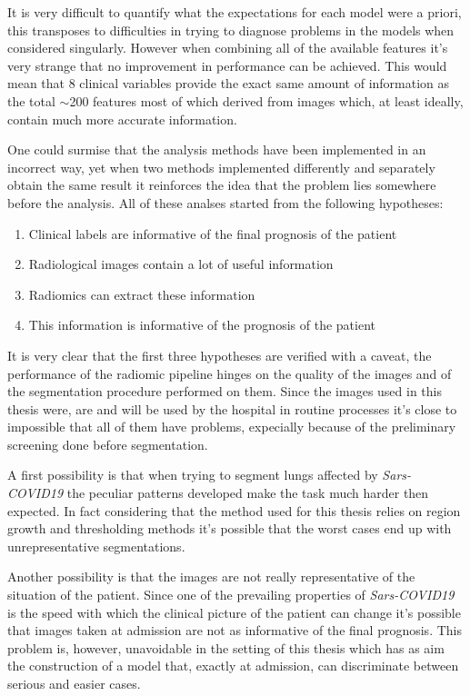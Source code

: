 It is very difficult to quantify what the expectations for each model were a priori, this transposes to difficulties in trying to diagnose problems in the models when considered singularly. However when combining all of the available features it's very strange that no improvement in performance can be achieved.
This would mean that 8 clinical variables provide the exact same amount of information as the total $\sim$200 features most of which derived from images which, at least ideally, contain much more accurate information. 

One could surmise that the analysis methods have been implemented in an incorrect way, yet when two methods implemented differently and separately obtain the same result it reinforces the idea that the problem lies somewhere before the analysis.
 All of these analses started from the following hypotheses:

\begin{enumerate}
\item Clinical labels are informative of the final prognosis of the patient
\item Radiological images contain a lot of useful information
\item Radiomics can extract these information
\item This information is informative of the prognosis of the patient
\end{enumerate}

It is very clear that the first three hypotheses are verified with a caveat, the performance of the radiomic pipeline hinges on the quality of the images and of the segmentation procedure performed on them. Since the images used in this thesis were, are and will be used by the hospital in routine processes it's close to impossible that all of them have problems, expecially because of the preliminary screening done before segmentation.

A first possibility is that when trying to segment lungs affected by \textit{Sars-COVID19} the peculiar patterns developed make the task much harder then expected.
In fact considering that the method used for this thesis relies on region growth and thresholding methods it's possible that the worst cases end up with unrepresentative segmentations.

Another possibility is that the images are not really representative of the situation of the patient. Since one of the prevailing properties of \textit{Sars-COVID19} is the speed with which the clinical picture of the patient can change it's possible that images taken at admission are not as informative of the final prognosis. This problem is, however, unavoidable in the setting of this thesis which has as aim the construction of a model that, exactly at admission, can discriminate between serious and easier cases.

